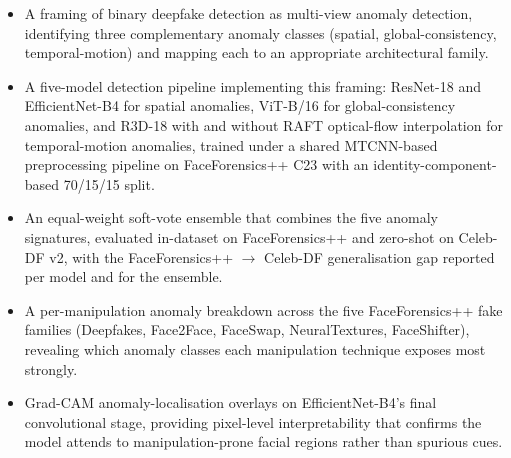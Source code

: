 \begin{itemize}
    \item A framing of binary deepfake detection as multi-view anomaly detection, identifying three complementary anomaly classes (spatial, global-consistency, temporal-motion) and mapping each to an appropriate architectural family.
    \item A five-model detection pipeline implementing this framing: ResNet-18 and EfficientNet-B4 for spatial anomalies, ViT-B/16 for global-consistency anomalies, and R3D-18 with and without RAFT optical-flow interpolation for temporal-motion anomalies, trained under a shared MTCNN-based preprocessing pipeline on FaceForensics++ C23 with an identity-component-based 70/15/15 split.
    \item An equal-weight soft-vote ensemble that combines the five anomaly signatures, evaluated in-dataset on FaceForensics++ and zero-shot on Celeb-DF v2, with the FaceForensics++ \(\rightarrow\) Celeb-DF generalisation gap reported per model and for the ensemble.
    \item A per-manipulation anomaly breakdown across the five FaceForensics++ fake families (Deepfakes, Face2Face, FaceSwap, NeuralTextures, FaceShifter), revealing which anomaly classes each manipulation technique exposes most strongly.
    \item Grad-CAM anomaly-localisation overlays on EfficientNet-B4's final convolutional stage, providing pixel-level interpretability that confirms the model attends to manipulation-prone facial regions rather than spurious cues.
\end{itemize}
